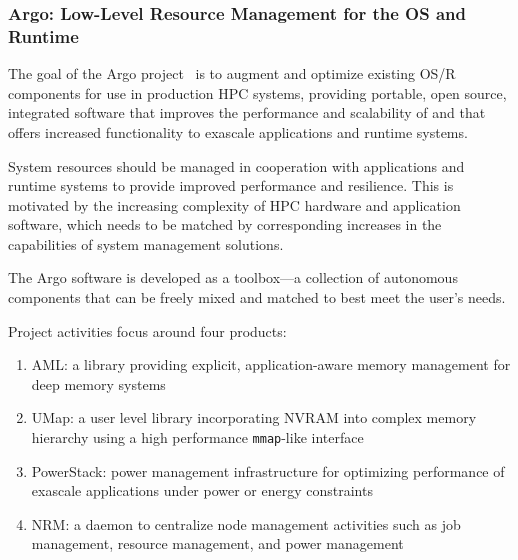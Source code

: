 \subsubsection{ Argo: Low-Level Resource Management for the OS and Runtime}

The goal of the Argo project~\cite{perarnau2017argo} is to augment and
optimize existing OS/R components for use in production HPC systems,
providing portable, open source, integrated software that improves the
performance and scalability of and that offers increased functionality to
exascale applications and runtime systems.

System resources should be managed in cooperation with applications and
runtime systems to provide improved performance and resilience. This is
motivated by the increasing complexity of HPC hardware and application
software, which needs to be matched by corresponding increases in the
capabilities of system management solutions.

The Argo software is developed as a toolbox---a collection of autonomous
components that can be freely mixed and matched to best meet the user's
needs.

Project activities focus around four products:
\begin{enumerate}
\item AML: a library providing explicit, application-aware memory
management for deep memory systems

\item UMap: a user level library incorporating NVRAM into complex memory
hierarchy using a high performance \texttt{mmap}-like interface

\item PowerStack: power management infrastructure for optimizing performance
of exascale applications under power or energy constraints

\item NRM: a daemon to centralize node management activities such as
job management, resource management, and power management
\end{enumerate}





